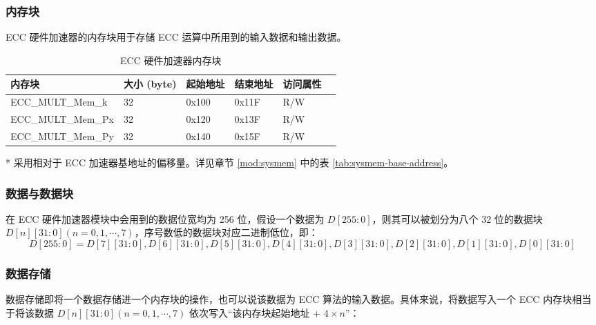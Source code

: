 \documentclass[main\_\_CN.tex]{subfiles}
\begin{document}
\subsubsection{内存块}
ECC 硬件加速器的内存块用于存储 ECC 运算中所用到的输入数据和输出数据。
\begin{table}[H]
    \centering
    \caption{ECC 硬件加速器内存块} \label{tab:ecc-memory}
    \begin{threeparttable}
    \begin{tabular}{ | l | l | l | l | l | l | }
    \hline
        \rowcolor{lightgray}
        \textbf{内存块} & \textbf{大小 (byte)}  &  \textbf{起始地址}\tnote{*} &  \textbf{结束地址} \tnote{*} & \textbf{访问属性}   \\ \hline
        ECC\_MULT\_Mem\_k    & 32  & 0x100 & 0x11F & R/W \\ \hline
        ECC\_MULT\_Mem\_Px   & 32  & 0x120 & 0x13F & R/W \\ \hline
        ECC\_MULT\_Mem\_Py   & 32  & 0x140 & 0x15F & R/W \\ \hline
    \end{tabular}
    \begin{tablenotes}
        \item[*] 采用相对于 ECC 加速器基地址的偏移量。详见章节 \ref{mod:sysmem} \textit{} 中的表 \ref{tab:sysmem-base-address}。
    \end{tablenotes}
    \end{threeparttable}
\end{table}

\subsubsection{数据与数据块}

在 ECC 硬件加速器模块中会用到的数据位宽均为 256 位，假设一个数据为 $D[255:0]$，则其可以被划分为八个 32 位的数据块 $D[n][31:0](n=0,1,\cdots,7)$，序号数低的数据块对应二进制低位，即：
\[
D[255:0] = {D[7][31:0],D[6][31:0],D[5][31:0],
D[4][31:0],D[3][31:0],D[2][31:0],D[1][31:0],D[0][31:0]}
\]

\subsubsection{数据存储}

数据存储即将一个数据存储进一个内存块的操作，也可以说该数据为 ECC 算法的输入数据。具体来说，将数据写入一个 ECC 内存块相当于将该数据 $D[n][31:0] (n=0, 1, \cdots, 7)$ 依次写入“该内存块起始地址 + $
4 \times n$”：
\end{document}
